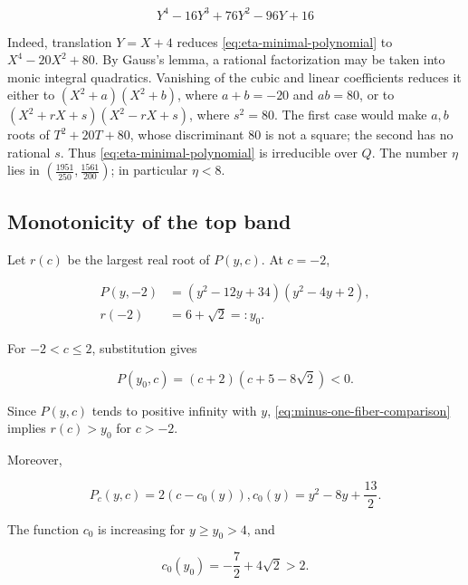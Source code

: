 \begin{equation}
\label{eq:eta-minimal-polynomial}
Y^{4}-16Y^{3}+76Y^{2}-96Y+16
\end{equation}

Indeed, translation \(Y=X+4\) reduces \eqref{eq:eta-minimal-polynomial} to
\(X^{4}-20X^{2}+80\). By Gauss's lemma, a rational factorization may be taken into
monic integral quadratics. Vanishing of the cubic and linear coefficients
reduces it either to \((X^{2}+a)(X^{2}+b)\), where
\(a+b=-20\) and \(ab=80\), or to
\((X^{2}+rX+s)(X^{2}-rX+s)\), where \(s^{2}=80\). The first case would make \(a,b\)
roots of \(T^{2}+20T+80\), whose discriminant 80 is not a square; the second has
no rational \(s\). Thus \eqref{eq:eta-minimal-polynomial} is irreducible over \(Q\). The number \(\eta\) lies in
\((\frac{1951}{250},\frac{1561}{200})\); in particular \(\eta<8\).

\subsection{Monotonicity of the top band}

Let \(r(c)\) be the largest real root of \(P(y,c)\). At \(c=-2\),

\begin{equation}
\label{eq:minus-one-fiber-factorization}
\begin{aligned}
P(y,-2)&=(y^{2}-12y+34)(y^{2}-4y+2), \\
r(-2)&=6+\sqrt{2}=:y_{0}.
\end{aligned}
\end{equation}

For \(-2<c\leq 2\), substitution gives

\begin{equation}
\label{eq:minus-one-fiber-comparison}
P(y_{0},c)=(c+2)(c+5-8\sqrt{2})<0.
\end{equation}

Since \(P(y,c)\) tends to positive infinity with \(y\), \eqref{eq:minus-one-fiber-comparison} implies
\(r(c)>y_{0}\) for \(c>-2\).

Moreover,

\begin{equation}
\label{eq:floquet-c-derivative}
P_c(y,c)=2(c-c_{0}(y)),       c_{0}(y)=y^{2}-8y+\frac{13}{2}.
\end{equation}

The function \(c_{0}\) is increasing for \(y\geq y_{0}>4\), and

\begin{equation}
c_{0}(y_{0})=-\frac{7}{2}+4\sqrt{2}>2.
\end{equation}

